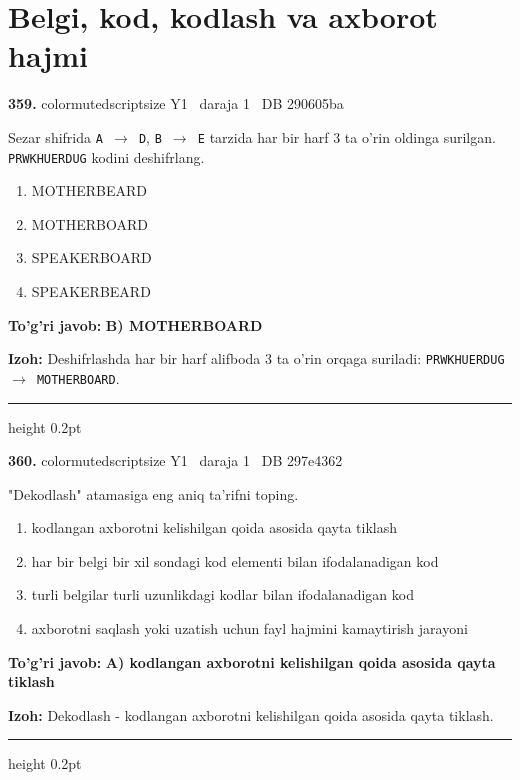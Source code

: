 \documentclass[10pt,a4paper,oneside]{article}
\begin{document}
\section{Belgi, kod, kodlash va axborot hajmi}

\noindent\textbf{\color{ink}359.}  {color{muted}scriptsize Y1 \textbullet\ daraja 1 \textbullet\ DB 290605ba}
\par
Sezar shifrida \texttt{A \ensuremath{\to} D}, \texttt{B \ensuremath{\to} E} tarzida har bir harf 3 ta o'rin oldinga surilgan. \texttt{PRWKHUERDUG} kodini deshifrlang.
\begin{enumerate}[label=\Alph*),leftmargin=9mm]
\item MOTHERBEARD
\item MOTHERBOARD
\item SPEAKERBOARD
\item SPEAKERBEARD
\end{enumerate}
\begin{tcolorbox}[enhanced,breakable,colback=teal!4,colframe=teal!50!black,boxrule=0.5pt,arc=1.1mm,left=3mm,right=3mm,top=1.7mm,bottom=1.7mm,before skip=2mm,after skip=2mm]
\textbf{\color{teal}To'g'ri javob:} \textbf{B) MOTHERBOARD}
\par\smallskip
\textbf{Izoh:} Deshifrlashda har bir harf alifboda 3 ta o'rin orqaga suriladi: \texttt{PRWKHUERDUG \ensuremath{\to} MOTHERBOARD}.
\end{tcolorbox}
\vspace{2mm}\hrule height 0.2pt \vspace{3mm}

\noindent\textbf{\color{ink}360.}  {color{muted}scriptsize Y1 \textbullet\ daraja 1 \textbullet\ DB 297e4362}
\par
"Dekodlash" atamasiga eng aniq ta'rifni toping.
\begin{enumerate}[label=\Alph*),leftmargin=9mm]
\item kodlangan axborotni kelishilgan qoida asosida qayta tiklash
\item har bir belgi bir xil sondagi kod elementi bilan ifodalanadigan kod
\item turli belgilar turli uzunlikdagi kodlar bilan ifodalanadigan kod
\item axborotni saqlash yoki uzatish uchun fayl hajmini kamaytirish jarayoni
\end{enumerate}
\begin{tcolorbox}[enhanced,breakable,colback=teal!4,colframe=teal!50!black,boxrule=0.5pt,arc=1.1mm,left=3mm,right=3mm,top=1.7mm,bottom=1.7mm,before skip=2mm,after skip=2mm]
\textbf{\color{teal}To'g'ri javob:} \textbf{A) kodlangan axborotni kelishilgan qoida asosida qayta tiklash}
\par\smallskip
\textbf{Izoh:} Dekodlash - kodlangan axborotni kelishilgan qoida asosida qayta tiklash.
\end{tcolorbox}
\vspace{2mm}\hrule height 0.2pt \vspace{3mm}
\end{document}
